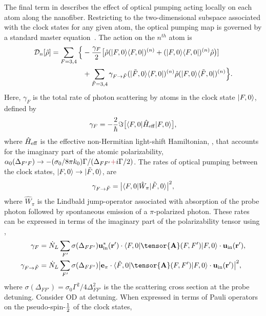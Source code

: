 \documentclass[preprint,aps,pra,onecolumn]{revtex4-1} %
\newcommand{\inp}{{\rm in}}
\newcommand{\charpol}{\alpha_0(\Delta_{F'F})}
\newcommand{\half}{\smallfrac{1}{2}}
\newcommand{\comment}[1]{{\color{Maroon} #1}}
\begin{document}
The final term in  describes the effect of optical pumping acting locally on each atom along the nanofiber. 
Restricting to the two-dimensional subspace associated with the clock states for any given atom, the optical pumping map is governed by a standard master equation~\cite{deutsch_quantum_2010}.  
The action on the $n^{th}$ atom is
	\begin{align}
		\mathcal{D}_n[\hat{\rho}] =  \sum_{F=3,4} \Big\{& -\frac{\gamma_{F}}{2} \big[ \hat{\rho} (\lvert{F,0}\rangle\langle{F,0}\rvert)^{(n)} + (\lvert{F,0}\rangle\langle{F,0}\rvert)^{(n)}\hat{\rho} \big)]\\
		&+  \sum_{\tilde{F} =3,4}  \gamma_{F \rightarrow \tilde{F}}(\lvert{\tilde{F},0}\rangle\langle{F,0}\rvert)^{(n)} \hat{\rho}(\lvert{F,0}\rangle\langle{\tilde{F},0}\rvert)^{(n)} \Big\}.\nonumber
	\end{align}
Here, $\gamma_{F}$ is the total rate of photon scattering by atoms in the clock state $\lvert{F,0}\rangle$, defined by
	\begin{equation}
		\gamma_{F}=- \frac{2}{\hbar} \Im \big[ \langle{F,0}\rvert \hat{H}_{\rm eff}\lvert{F,0}\rangle \big] ,
	\end{equation}
where $\hat{H}_{\text{eff}}$ is the effective non-Hermitian light-shift Hamiltonian, , that accounts for the imaginary part of the atomic polarizability, $\charpol \rightarrow -(\sigma_0/8\pi k_0) \Gamma/(\Delta_{FF'}\comment{+}i\Gamma/2)$. 
The rates of optical pumping between the clock states, $\lvert{F,0}\rangle \rightarrow \lvert{\tilde{F},0}\rangle$, are
	\begin{equation}
		\gamma_{F \rightarrow \tilde{F} } =\big| \langle{F,0}\rvert \hat{W}_\pi \lvert{\tilde{F},0}\rangle \big|^2,
	\end{equation}
where $\hat{W}_\pi$ is the Lindbald jump-operator associated with absorption of the probe photon followed by spontaneous emission of a $\pi$-polarized photon.  
These rates can be expressed in terms of the imaginary part of the polarizability tensor using ,
	\begin{align}
		\gamma_F &=\dot{N}_L  \sum_{F'} \sigma (\Delta_{FF'} ) \mathbf{u}^*_\inp(\br')\cdot \bra{F,0} \tensor{\mathbf{A}}(F,F') \ket{F,0}  \cdot \mathbf{u}_\inp(\br'), \\
		\gamma_{F \rightarrow \tilde{F}}&=  \dot{N}_L  \sum_{F'} \sigma (\Delta_{FF'}) \big| \mathbf{e}_\pi\cdot \bra{\tilde{F},0} \tensor{\mathbf{A}}(F,F') \ket{F,0}  \cdot \mathbf{u}_\inp(\br') \big|^2 ,
	\end{align}
where $ \sigma (\Delta_{FF'} )  = \sigma_0 \Gamma^2/4\Delta^2_{FF'}$ is the the scattering cross section at the probe detuning. \comment{Consider OD at detuning.} When expressed in terms of Pauli operators on the pseudo-spin-$\half$ of the clock states,
\end{document}
